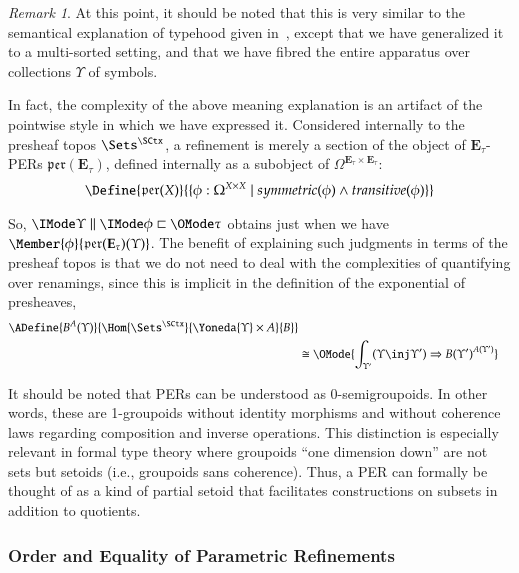 \documentclass[11pt]{article}
\theoremstyle{definition}
\theoremstyle{notation}
\theoremstyle{remark}
\newtheorem{remark}[thm]{Remark}
\numberwithin{equation}{section}
\newcommand\Exprs{\mathbf{E}}
\begin{document}
\begin{remark}

  At this point, it should be noted that this is very similar to the semantical
  explanation of typehood given in~\cite{martin-lof:1979}, except that we have
  generalized it to a multi-sorted setting, and that we have fibred the entire
  apparatus over collections $\Upsilon$ of symbols.

  In fact, the complexity of the above meaning explanation is an artifact of
  the pointwise style in which we have expressed it. Considered internally to
  the presheaf topos $\Sets^\SCtx$, a refinement is merely a section of the
  object of $\Exprs_\tau$-PERs $\mathfrak{per}(\Exprs_\tau)$, defined
  internally as a subobject of $\Omega^{\Exprs_\tau\times\Exprs_\tau}$:
  \[
    \Define{
      \mathfrak{per}(X)
    }{
      \{ \phi : \Omega^{X\times X}
         \mid
         symmetric(\phi)
         \land transitive(\phi)
      \}
    }
  \]

  So, $\Refines{\Upsilon}{\phi}{\tau}$ obtains just when we have
  $\Member{\phi}{\mathfrak{per}(\Exprs_\tau)(\Upsilon)}$. The benefit of
  explaining such judgments in terms of the presheaf topos is that we do not
  need to deal with the complexities of quantifying over renamings, since this
  is implicit in the definition of the exponential of presheaves,
  \begin{align*}
    \ADefine{
      B^A(\Upsilon)
    }{
      \Hom{\Sets^\SCtx}{
        \Yoneda{\Upsilon}\times A
      }{
        B
      }
    }\\
    &\cong
    \OMode{
      \int_{\Upsilon'}
      (\Upsilon\inj\Upsilon')
      \Rightarrow
      {B(\Upsilon')}^{A(\Upsilon')}
    }
  \end{align*}

  It should be noted that PERs can be understood as 0-semigroupoids. In other
  words, these are 1-groupoids without identity morphisms and without coherence
  laws regarding composition and inverse operations. This distinction is
  especially relevant in formal type theory where groupoids ``one dimension
  down'' are not sets but setoids (i.e., groupoids sans coherence). Thus, a PER
  can formally be thought of as a kind of partial setoid that facilitates
  constructions on subsets in addition to quotients. 

\end{remark}

\subsubsection{Order and Equality of Parametric Refinements}
\end{document}
